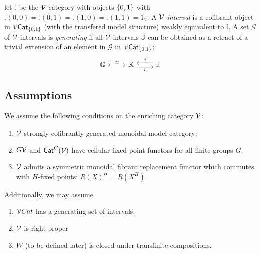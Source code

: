 \documentclass[psamsfonts,oneside,10pt,letterpaper
,draft
]{amsart}%
\renewcommand{\F}{\mathcal F}
\newcommand{\I}{\ensuremath{\mathbb{I}}}
\newcommand{\J}{\ensuremath{\mathbb{J}}}
\renewcommand{\1}{\ensuremath{\mathbb{id}}}
\begin{document}
\begin{definition}
      let $\I$ be the $\mathcal V$-category with objects $\left\{0,1\right\}$ with $\I(0,0) = \I(0,1) = \I(1,0) = \I(1,1) = 1_V$. A {\em $\mathcal V$-interval} is a cofibrant object in $\mathcal V\mathsf{Cat}_{\left\{0,1\right\}}$ (with the transfered model structure) weakly equivalent to $\I$. A set $\mathcal{G}$ of $\mathcal V$-intervals is {\em generating} if all $\mathcal V$-intervals $\J$ can be obtained as a retract of a trivial extension of an element in $\mathcal{G}$ in $\mathcal V\mathsf{Cat}_{\left\{0,1\right\}}$:
      \[
            \begin{tikzcd}
                  \mathbb{G} \arrow[r,rightarrowtail, "\simeq"] & \mathbb{K} \arrow[r,yshift=-.3em, "r"'] & \mathbb{J} \arrow[l,yshift=.3em, "i"']
            \end{tikzcd}
      \]
\end{definition}

\subsection{Assumptions}

We assume the following conditions on the enriching category $\mathcal V$:

\begin{enumerate}
\item $\mathcal V$ strongly cofibrantly generated monoidal model category;
\item $G\mathcal V$ and $\mathsf{Cat}^G(\mathcal V)$ have cellular fixed point functors for all finite groups $G$;
\item $\mathcal V$ admits a symmetric monoidal fibrant replacement functor which commutes with $H$-fixed points: $R(X)^H = R(X^H)$. 
\end{enumerate}

Additionally, we may assume
\begin{enumerate}
\item $\mathcal V Cat$ has a generating set of intervals;
\item $\mathcal V$ is right proper
\item $W$ (to be defined later) is closed under transfinite compositions.
\end{enumerate}
\end{document}
